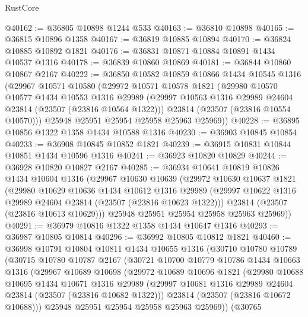 \begin{lexlean}{RustCore}
\begin{coremodule}
@40162 := @36805 @10898 @1244 @533
@40163 := @36810 @10898
@40165 := @36815 @10896 @1358
@40167 := @36819 @10885 @10894
@40170 := @36824 @10885 @10892 @1821
@40176 := @36831 @10871 @10884 @10891 @1434 @10537 @1316
@40178 := @36839 @10860 @10869
@40181 := @36844 @10860 @10867 @2167
@40222 := @36850
    @10582
    @10859
    @10866
    @1434
    @10545
    @1316
    (@29967
      @10571
      @10580
      (@29972
        @10571
        @10578
        @1821
        (@29980
          @10570
          @10577
          @1434
          @10553
          @1316
          @29989
          (@29997 @10563 @1316 @29989 @24604 @23814 (@23507 (@23816 @10564 @1322)))
          @23814
          (@23507 (@23816 @10554 @10570)))
        @25948
        @25951
        @25954
        @25958
        @25963
        @25969))
@40228 := @36895 @10856 @1322 @1358 @1434 @10588 @1316
@40230 := @36903 @10845 @10854
@40233 := @36908 @10845 @10852 @1821
@40239 := @36915 @10831 @10844 @10851 @1434 @10596 @1316
@40241 := @36923 @10820 @10829
@40244 := @36928 @10820 @10827 @2167
@40285 := @36934
    @10641
    @10819
    @10826
    @1434
    @10604
    @1316
    (@29967
      @10630
      @10639
      (@29972
        @10630
        @10637
        @1821
        (@29980
          @10629
          @10636
          @1434
          @10612
          @1316
          @29989
          (@29997 @10622 @1316 @29989 @24604 @23814 (@23507 (@23816 @10623 @1322)))
          @23814
          (@23507 (@23816 @10613 @10629)))
        @25948
        @25951
        @25954
        @25958
        @25963
        @25969))
@40291 := @36979 @10816 @1322 @1358 @1434 @10647 @1316
@40293 := @36987 @10805 @10814
@40296 := @36992 @10805 @10812 @1821
@40460 := @36998
    @10791
    @10804
    @10811
    @1434
    @10655
    @1316
    (@30710
      @10780
      @10789
      (@30715
        @10780
        @10787
        @2167
        (@30721
          @10700
          @10779
          @10786
          @1434
          @10663
          @1316
          (@29967
            @10689
            @10698
            (@29972
              @10689
              @10696
              @1821
              (@29980
                @10688
                @10695
                @1434
                @10671
                @1316
                @29989
                (@29997 @10681 @1316 @29989 @24604 @23814 (@23507 (@23816 @10682 @1322)))
                @23814
                (@23507 (@23816 @10672 @10688)))
              @25948
              @25951
              @25954
              @25958
              @25963
              @25969))
          (@30765

\end{coremodule}
\end{lexlean}
